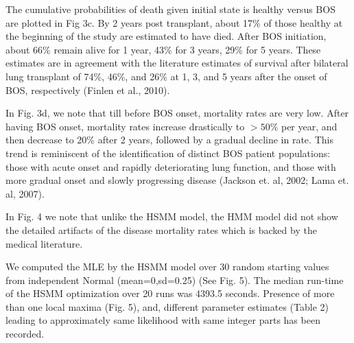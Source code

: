\documentclass{uwstat572}
\begin{document}
The cumulative probabilities of death given initial state is healthy versus BOS are plotted in Fig 3c. By 2 years post transplant, about 17\% of those healthy at the beginning of the study are estimated to have died. After BOS initiation, about 66\% remain alive for 1 year, 43\% for 3 years, 29\% for 5 years. These estimates are in agreement with the literature estimates of survival after bilateral lung transplant of 74\%, 46\%, and 26\% at 1, 3, and 5 years after the onset of BOS, respectively (Finlen et al., 2010).

In Fig. 3d, we note that till before BOS onset, mortality rates are very low. After having BOS onset, mortality rates increase drastically to $>50\%$ per year, and then decrease to 20\% after 2 years, followed by a gradual decline in rate. This trend is reminiscent of the identification of distinct BOS patient populations: those with acute onset and rapidly deteriorating lung function, and those with more gradual onset and slowly progressing disease (Jackson et. al, 2002; Lama et. al, 2007).


In Fig. 4 we note that unlike the HSMM model, the HMM model did not show the detailed artifacts of the disease mortality rates which is backed by the medical literature.

We computed the MLE by the HSMM model over 30 random starting values from independent Normal (mean=0,sd=0.25) (See Fig. 5). The median run-time of the HSMM optimization over 20 runs was 4393.5 seconds. Presence of more than one local maxima (Fig. 5), and, different parameter estimates (Table 2) leading to approximately same likelihood with same integer parts has been recorded. 

\begin{table}
\centering
{}
\caption{This is a demonstration of non-identifiability of the likelihood for the BOS dataset. Two different parameter sets lead to approximately the same likelihood.}
\end{table}
\end{document}
